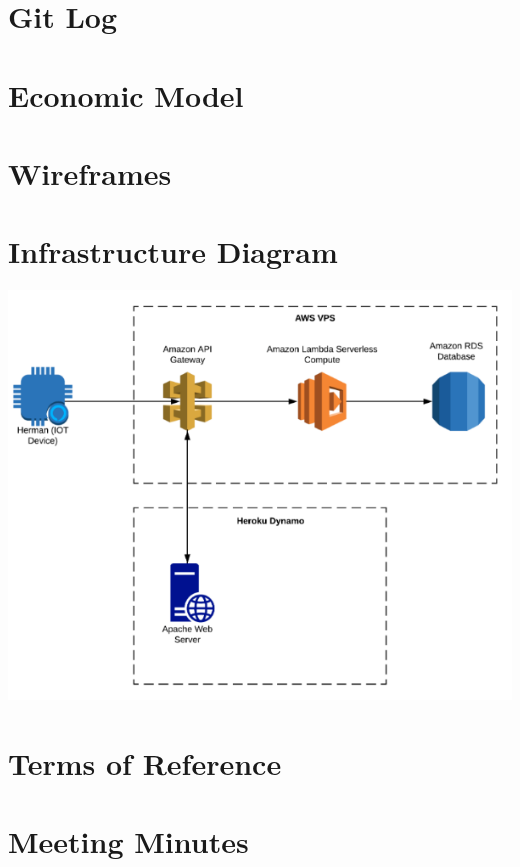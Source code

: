 \documentclass[]{report}
\begin{document}
	
	
	\newpage
	\begin{appendices}
		\chapter{Git Log}
		
		\chapter{Economic Model}
		
		\chapter{Wireframes}
		
		\chapter{Infrastructure Diagram}
		\includegraphics{awsmodel.png}
		\chapter{Terms of Reference}
		
		\chapter{Meeting Minutes}
		
	\end{appendices}
\end{document}
